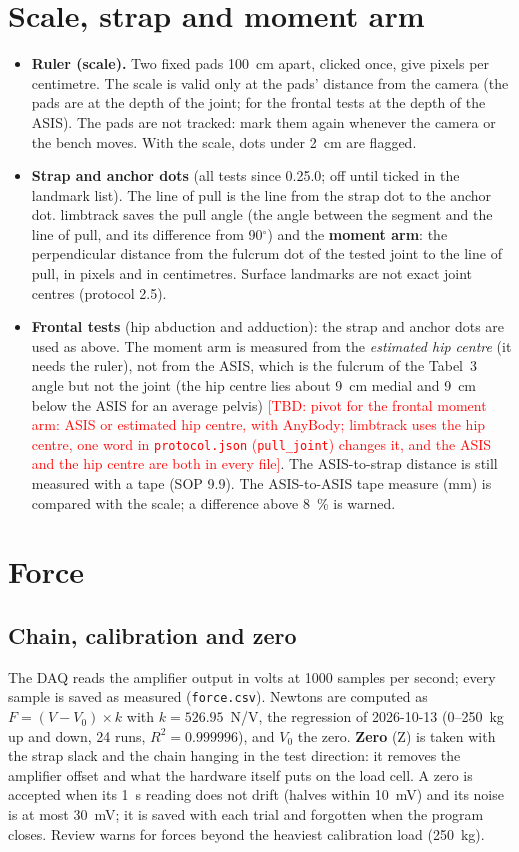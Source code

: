 \documentclass[a4paper,10pt]{article}
\newcommand{\lt}{\textsf{limbtrack}}
\newcommand{\code}[1]{\texttt{#1}}
\newcommand{\dg}{\ensuremath{^\circ}}
\newcommand{\tbd}[1]{\textcolor{red}{[TBD: #1]}}
\begin{document}
\section{Scale, strap and moment arm}\label{sec:scale}
\begin{itemize}
\item \textbf{Ruler (scale).} Two fixed pads 100~cm apart, clicked once, give pixels per centimetre. The scale is valid only at the
  pads' distance from the camera (the pads are at the depth of the joint; for the frontal tests at the depth of the ASIS). The pads are not
  tracked: mark them again whenever the camera or the bench moves. With the scale, dots under 2~cm are flagged.
\item \textbf{Strap and anchor dots} (all tests since 0.25.0; off until ticked in the landmark list). The line of pull is the line from the
  strap dot to the anchor dot. \lt{} saves the pull angle (the angle between the segment and the line of pull, and its difference from
  90\dg) and the \textbf{moment arm}: the perpendicular distance from the fulcrum dot of the tested joint to the line of pull, in pixels and
  in centimetres. Surface landmarks are not exact joint centres (protocol 2.5).
\item \textbf{Frontal tests} (hip abduction and adduction): the strap and anchor dots are used as above. The moment arm is measured from
  the \emph{estimated hip centre} (it needs the ruler), not from the ASIS, which is the fulcrum of the Tabel~3 angle but not the joint
  (the hip centre lies about 9~cm medial and 9~cm below the ASIS for an average pelvis)
  \tbd{pivot for the frontal moment arm: ASIS or estimated hip centre, with AnyBody; \lt{} uses the hip centre, one word in
  \code{protocol.json} (\code{pull\_joint}) changes it, and the ASIS and the hip centre are both in every file}. The ASIS-to-strap distance
  is still measured with a tape (SOP 9.9). The ASIS-to-ASIS tape measure (mm) is compared with the scale; a difference above 8~\% is warned.
\end{itemize}

\section{Force}\label{sec:force}
\subsection{Chain, calibration and zero}
The DAQ reads the amplifier output in volts at 1000 samples per second; every sample is saved as measured (\code{force.csv}). Newtons are
computed as $F = (V - V_0)\times k$ with $k = 526.95$~N/V, the regression of 2026-10-13 (0--250~kg up and down, 24 runs, $R^2 = 0.999996$),
and $V_0$ the zero. \textbf{Zero} (Z) is taken with the strap slack and the chain hanging in the test direction: it removes the
amplifier offset and what the hardware itself puts on the load cell. A zero is accepted when its 1~s reading does not drift (halves within
10~mV) and its noise is at most 30~mV; it is saved with each trial and forgotten when the program closes. Review warns for forces beyond
the heaviest calibration load (250~kg).
\end{document}
